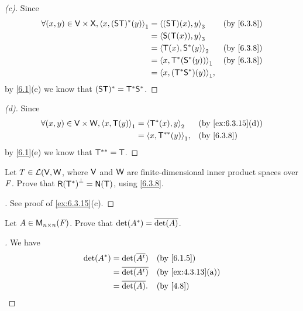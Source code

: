 \begin{proof}[(c)]
	Since
	\begin{align*}
		\forall (x, y) \in \V \times \vs{X}, \inn{x, (\lt{S} \T)^*(y)}_1 & = \inn{(\lt{S} \T)(x), y}_3      &  & \by{6.3.8} \\
		                                                                 & = \inn{\lt{S}(\T(x)), y}_3                       \\
		                                                                 & = \inn{\T(x), \lt{S}^*(y)}_2     &  & \by{6.3.8} \\
		                                                                 & = \inn{x, \T^*(\lt{S}^*(y))}_1   &  & \by{6.3.8} \\
		                                                                 & = \inn{x, (\T^* \lt{S}^*)(y)}_1,
	\end{align*}
	by \cref{6.1}(e) we know that \((\mathsf{S} \mathsf{T})^* = \mathsf{T}^* \mathsf{S}^*\).
\end{proof}

\begin{proof}[(d)]
	Since
	\begin{align*}
		\forall (x, y) \in \V \times \W, \inn{x, \T(y)}_1 & = \inn{\T^*(x), y}_2     &  & \by{ex:6.3.15}[d] \\
		                                                  & = \inn{x, \T^{**}(y)}_1, &  & \by{6.3.8}
	\end{align*}
	by \cref{6.1}(e) we know that \(\mathsf{T}^{**} = \mathsf{T}\).
\end{proof}

\begin{ex}\label{ex:6.3.17}
	Let \(T \in \mathcal{L}(\mathsf{V}, \mathsf{W}\), where \(\mathsf{V}\) and \(\mathsf{W}\) are finite-dimensional inner product spaces over \(\mathit{F}\).
	Prove that \(\rg{\T^*}^{\perp} = \ns{\T}\), using \cref{6.3.8}.
\end{ex}

\begin{proof}[]
	See proof of \cref{ex:6.3.15}(c).
\end{proof}

\begin{ex}\label{ex:6.3.18}
	Let \(A \in \mathsf{M}_{{n} \times n}({\mathit{F}})\).
	Prove that \(\det(A^*) = \overline{\det(A)}\).
\end{ex}

\begin{proof}[]
	We have
	\begin{align*}
		\det(A^*) & = \det(\conj{\tp{A}}) &  & \by{6.1.5}        \\
		          & = \conj{\det(\tp{A})} &  & \by{ex:4.3.13}[a] \\
		          & = \conj{\det(A)}.     &  & \by{4.8}
	\end{align*}
\end{proof}

